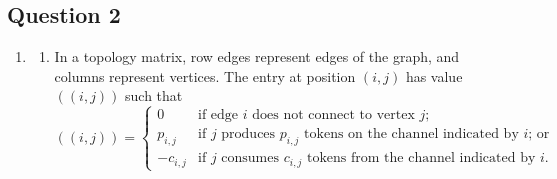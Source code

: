 \documentclass{article}
\numberwithin{equation}{section}
\numberwithin{table}{section}
\numberwithin{figure}{section}
\begin{document}
\subsection{Question 2}
\begin{enumerate}
    \item \begin{enumerate}
        \item In a topology matrix, row edges represent edges of the graph, and
            columns represent vertices. The entry at position $(i,j)$ has value
            $((i,j))$ such that
            \begin{equation}
                ((i,j)) = \begin{cases}
                    0 & \text{if edge $i$ does not connect to vertex $j$;} \\
                    p_{i,j} & \text{if $j$ produces $p_{i,j}$ tokens on the
                        channel indicated by $i$; or} \\
                    -c_{i,j} & \text{if $j$ consumes $c_{i,j}$ tokens from the
                        channel indicated by $i$.}
                \end{cases}
            \end{equation}


\end{enumerate}
\end{enumerate}
\end{document}
